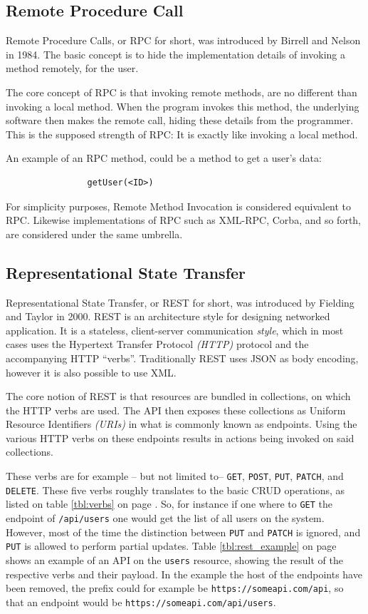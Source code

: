 		\subsection{Remote Procedure Call}
			Remote Procedure Calls, or RPC for short, was introduced by Birrell and Nelson \cite{birell1984} in 1984. The basic concept is to hide the implementation details of invoking a method remotely, for the user.

			The core concept of RPC is that invoking remote methods, are no different than invoking a local method. When the program invokes this method, the underlying software then makes the remote call, hiding these details from the programmer. This is the supposed strength of RPC: It is exactly like invoking a local method.

			An example of an RPC method, could be a method to get a user's data:
			\begin{verbatim}
				getUser(<ID>)
			\end{verbatim}

			For simplicity purposes, Remote Method Invocation is considered equivalent to RPC. Likewise implementations of RPC such as XML-RPC, Corba, and so forth, are considered under the same umbrella.

		\subsection{Representational State Transfer}
			Representational State Transfer, or REST for short, was introduced by Fielding and Taylor \cite{Fielding:2000:PDM:337180.337228} in 2000. REST is an architecture style for designing networked application. It is a stateless, client-server communication \emph{style}, which in most cases uses the Hypertext Transfer Protocol \emph{(HTTP)} protocol and the accompanying HTTP ``verbs''. Traditionally REST uses JSON as body encoding, however it is also possible to use XML.

			The core notion of REST is that resources are bundled in collections, on which the HTTP verbs are used. The API then exposes these collections as Uniform Resource Identifiers \emph{(URIs)} in what is commonly known as endpoints. Using the various HTTP verbs on these endpoints results in actions being invoked on said collections.

			These verbs are for example -- but not limited to-- \verb=GET=, \verb=POST=, \verb=PUT=, \verb=PATCH=, and \verb=DELETE=. These five verbs roughly translates to the basic CRUD operations, as listed on table \ref{tbl:verbs} on page \pageref{tbl:verbs}. So, for instance if one where to \verb=GET= the endpoint of \verb=/api/users= one would get the list of all users on the system. However, most of the time the distinction between \verb=PUT= and \verb=PATCH= is ignored, and \verb=PUT= is allowed to perform partial updates. Table \ref{tbl:rest_example} on page \pageref{tbl:rest_example} shows an example of an API on the \verb=users= resource, showing the result of the respective verbs and their payload. In the example the host of the endpoints have been removed, the prefix could for example be \verb=https://someapi.com/api=, so that an endpoint would be \verb=https://someapi.com/api/users=.

